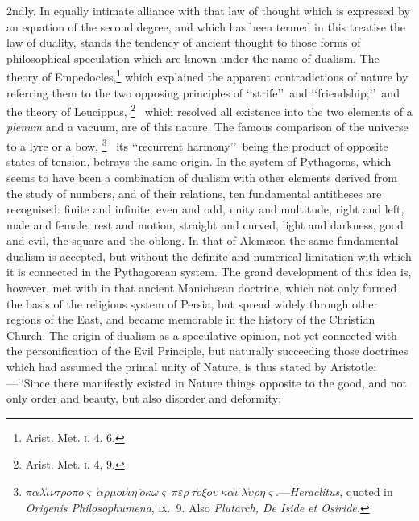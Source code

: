 \documentclass[oneside]{book}
\begin{document}
2ndly. In equally intimate alliance with that law of thought
which is expressed by an equation of the second degree, and
which has been termed in this treatise the law of duality, stands
the tendency of ancient thought to those forms of philosophical
speculation which are known under the name of dualism. The
theory of Empedocles,\footnote{Arist. Met. \textsc{i}. 4. 6.}
which explained the apparent contradictions of nature by referring them
to the two opposing principles
of \lq\lq strife\rq\rq\ and \lq\lq friendship;\rq\rq\ and the theory of Leucippus,%
\footnote{Arist. Met. \textsc{i.} 4, 9.}%
\ which resolved all existence into the two elements of a \emph{plenum}
and a vacuum, are of this nature. The famous comparison of the
universe to a lyre or a bow,%
\footnote{$ \pi\alpha\lambda\acute{\iota}\nu\tau\rho{o}\pi{o}\varsigma\ \grave{\alpha}\rho\mu{o}\nu\acute{\iota}\eta\  \ddot{o}\kappa\omega\varsigma\ \pi\varepsilon\rho\ \tau\acute{o}\xi{o}\upsilon\ \kappa\alpha\grave{\iota}\ \lambda\acute{\upsilon}\rho\eta\varsigma.
$---\textit{Heraclitus}, quoted in
\textit{Origenis Philosophumena}, \textsc{ix.}~9. Also \textit{Plutarch, De Iside et Osiride.}
%
}%
\ its \lq\lq recurrent harmony\rq\rq\ being the
product of opposite states of tension, betrays the same origin.
In the system of Pythagoras, which seems to have been a combination of dualism with other elements derived from the study of
numbers, and of their relations, ten fundamental antitheses are
recognised: finite and infinite, even and odd, unity and multitude,
right and left, male and female, rest and motion, straight and
curved, light and darkness, good and evil, the square and the
oblong. In that of Alcm{\ae}on the same fundamental dualism is
accepted, but without the definite and numerical limitation with
which it is connected in the Pythagorean system. The grand
development of this idea is, however, met with in that ancient
Manich{\ae}an doctrine, which not only formed the basis of the religious system of Persia, but spread widely through other regions
of the East, and became memorable in the history of the Christian
Church. The origin of dualism as a speculative opinion, not
yet connected with the personification of the Evil Principle, but
naturally succeeding those doctrines which had assumed the
primal unity of Nature, is thus stated by Aristotle:---\lq\lq Since
there manifestly existed in Nature things opposite to the good,
and not only order and beauty, but also disorder and deformity;
\end{document}
